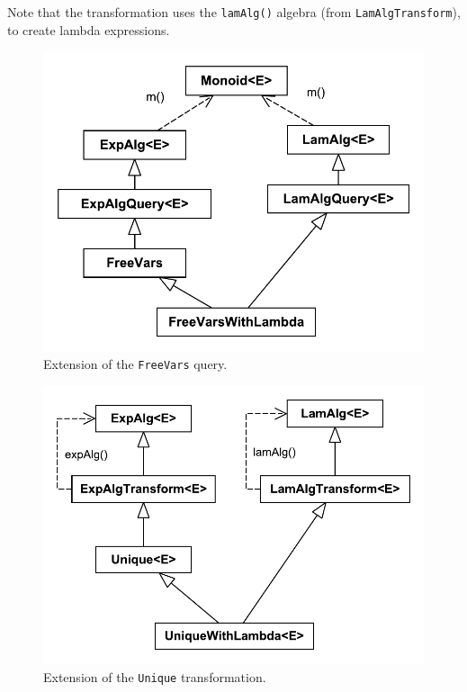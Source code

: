 
\noindent Note that the transformation uses the \lstinline{lamAlg()} algebra (from \lstinline{LamAlgTransform}),
to create lambda expressions.


\begin{figure}[t]
  \centering
  \nocaptionrule
  \includegraphics[width=0.9\linewidth]{extendQuery}
  \caption{Extension of the \lstinline{FreeVars} query.}
  \label{FIG:extensionQuery}
\end{figure}


\begin{figure}[h]
  \centering
  \nocaptionrule
  \includegraphics[width=0.9\linewidth]{extendTransform}
  \caption{Extension of the \lstinline{Unique} transformation.}
  \label{FIG:extensionTrafo}
\end{figure}


